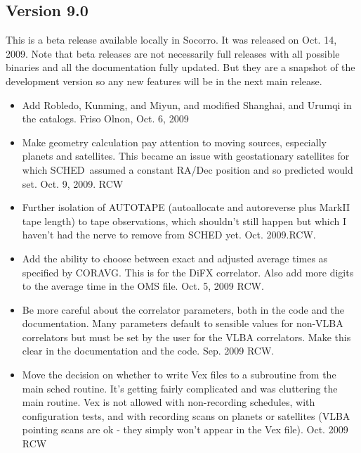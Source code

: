\documentclass{report}
\newcommand{\schedb}{{\sc SCHED~}}
\begin{document}
\subsection{\label{SSEC:VER_9.0}Version 9.0}

This is a beta release available locally in Socorro.  It was released
on Oct. 14, 2009.  Note that beta releases are not necessarily full
releases with all possible binaries and all the documentation fully
updated.  But they are a snapshot of the development version so any
new features will be in the next main release.

\begin{itemize}

\item Add Robledo, Kunming, and Miyun, and modified Shanghai, and
Urumqi in the catalogs.  Friso Olnon, Oct. 6, 2009

\item Make geometry calculation pay attention to moving sources,
especially planets and satellites.  This became an issue with
geostationary satellites for which \schedb assumed a constant RA/Dec
position and so predicted would set.  Oct. 9, 2009.  RCW

\item Further isolation of AUTOTAPE (autoallocate and autoreverse plus
MarkII tape length) to tape observations, which shouldn't still happen
but which I haven't had the nerve to remove from SCHED yet. Oct. 2009.RCW.

\item Add the ability to choose between exact and adjusted average
times as specified by CORAVG.  This is for the DiFX correlator. Also
add more digits to the average time in the OMS file.  Oct. 5, 2009 RCW.

\item Be more careful about the correlator parameters, both in the code
and the documentation.  Many parameters default to sensible values for
non-VLBA correlators but must be set by the user for the VLBA correlators.
Make this clear in the documentation and the code.  Sep. 2009 RCW.

\item Move the decision on whether to write Vex files to a subroutine
from the main sched routine.  It's getting fairly complicated and was
cluttering the main routine.  Vex is not allowed with non-recording
schedules, with configuration tests, and with recording scans on
planets or satellites (VLBA pointing scans are ok - they simply won't
appear in the Vex file). Oct. 2009 RCW


\end{itemize}
\end{document}
